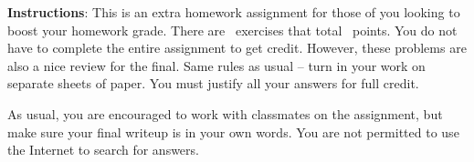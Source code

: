 \documentclass[10pt]{exam}
\begin{document}
\noindent \textbf{Instructions}: This is an extra homework assignment for those of you looking to boost your homework grade. There are \numquestions\, exercises that total \numpoints\, points. You do not have to complete the entire assignment to get credit. However, these problems are also a nice review for the final. Same rules as usual -- turn in your work on separate sheets of paper.  You must justify all your answers for full credit.

As usual, you are encouraged to work with classmates on the assignment, but make sure your final writeup is in your own words.  You are not permitted to use the Internet to search for answers.

\begin{questions}



\end{questions}
\end{document}
